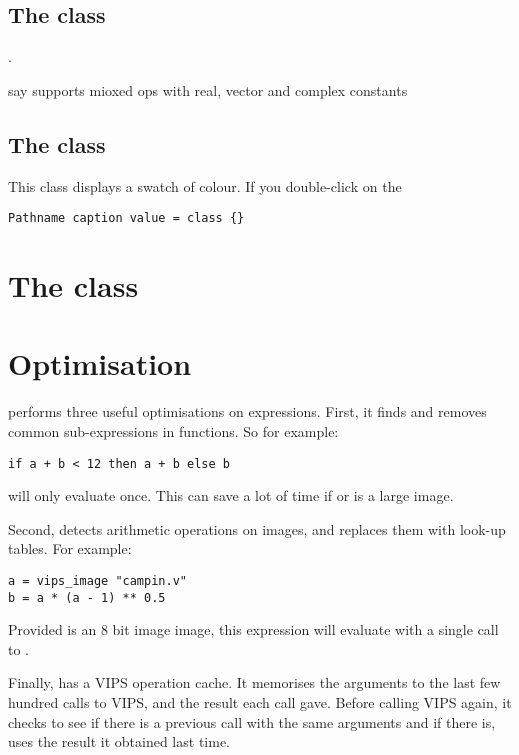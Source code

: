 \subsection{The  class}
.

say supports mioxed ops with real, vector and complex constants 

\subsection{The  class}

This class displays a swatch of colour. If you double-click on the

\begin{verbatim}
Pathname caption value = class {}
\end{verbatim}

\section{The  class}

\section{Optimisation}

\nip{} performs three useful optimisations on expressions. First, it finds and
removes common sub-expressions in functions. So for example:

\begin{verbatim}
if a + b < 12 then a + b else b
\end{verbatim}

\noindent
will only evaluate  once. This can save a lot of time if  or
 is a large image. 

Second, \nip{} detects arithmetic operations on  images, and
replaces them with look-up tables. For example:

\begin{verbatim}
a = vips_image "campin.v"
b = a * (a - 1) ** 0.5
\end{verbatim}

\noindent
Provided  is an 8 bit image image, this expression will
evaluate with a single call to .

Finally, \nip{} has a VIPS operation cache. It memorises the arguments to the 
last few hundred calls to VIPS, and the result each call gave. Before calling
VIPS again, it checks to see if there is a previous call with the same
arguments and if there is, uses the result it obtained last time.

